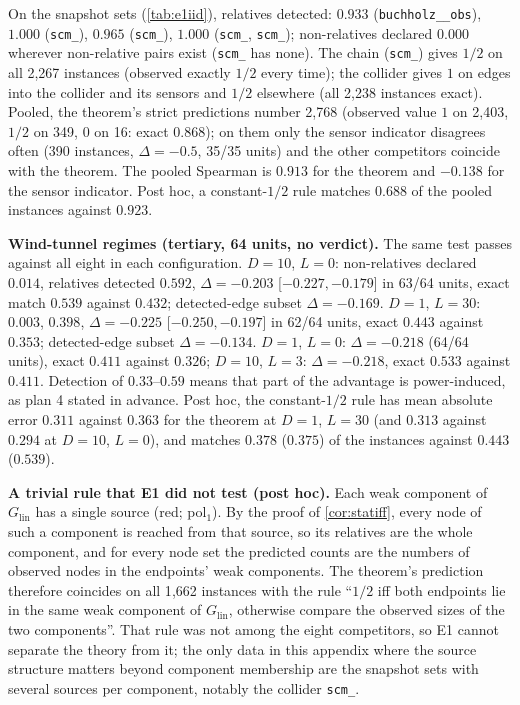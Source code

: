 On the snapshot sets (\cref{tab:e1iid}), relatives detected: $0.933$ (\texttt{buchholz\_\_\allowbreak obs}), $1.000$ (\texttt{scm\_}), $0.965$ (\texttt{scm\_}), $1.000$ (\texttt{scm\_}, \texttt{scm\_}); non-relatives declared $0.000$ wherever non-relative pairs exist (\texttt{scm\_} has none).
The chain (\texttt{scm\_}) gives $1/2$ on all 2{,}267 instances (observed exactly $1/2$ every time); the collider gives $1$ on edges into the collider and its sensors and $1/2$ elsewhere (all 2{,}238 instances exact).
Pooled, the theorem's strict predictions number 2{,}768 (observed value $1$ on 2{,}403, $1/2$ on 349, $0$ on 16: exact $0.868$); on them only the sensor indicator disagrees often (390 instances, $\Delta=-0.5$, 35/35 units) and the other competitors coincide with the theorem. The pooled Spearman is $0.913$ for the theorem and $-0.138$ for the sensor indicator.
Post hoc, a constant-$1/2$ rule matches $0.688$ of the pooled instances against $0.923$.

\textbf{Wind-tunnel regimes (tertiary, 64 units, no verdict).} The same test passes against all eight in each configuration. $D=10$, $L=0$: non-relatives declared $0.014$, relatives detected $0.592$, $\Delta=-0.203$ [$-0.227,-0.179$] in 63/64 units, exact match $0.539$ against $0.432$; detected-edge subset $\Delta=-0.169$.
$D=1$, $L=30$: $0.003$, $0.398$, $\Delta=-0.225$ [$-0.250,-0.197$] in 62/64 units, exact $0.443$ against $0.353$; detected-edge subset $\Delta=-0.134$. $D=1$, $L=0$: $\Delta=-0.218$ (64/64 units), exact $0.411$ against $0.326$; $D=10$, $L=3$: $\Delta=-0.218$, exact $0.533$ against $0.411$.
Detection of $0.33$--$0.59$ means that part of the advantage is power-induced, as plan 4 stated in advance. Post hoc, the constant-$1/2$ rule has mean absolute error $0.311$ against $0.363$ for the theorem at $D=1$, $L=30$ (and $0.313$ against $0.294$ at $D=10$, $L=0$), and matches $0.378$ ($0.375$) of the instances against $0.443$ ($0.539$).

\textbf{A trivial rule that E1 did not test (post hoc).} Each weak component of
$G_{\mathrm{lin}}$ has a single source (red; pol$_1$). By the proof of
\cref{cor:statiff}, every node of such a component is reached from that source,
so its relatives are the whole component, and for every node set the
predicted counts are the numbers of observed nodes in the endpoints' weak
components. The theorem's prediction therefore coincides on all 1{,}662
instances with the rule ``$1/2$ iff both endpoints lie in the same weak
component of $G_{\mathrm{lin}}$, otherwise compare the observed sizes of the two
components''. That rule was not among the eight competitors, so E1 cannot
separate the theory from it; the only data in this appendix where the source
structure matters beyond component membership are the snapshot sets with
several sources per component, notably the collider \texttt{scm\_}.

